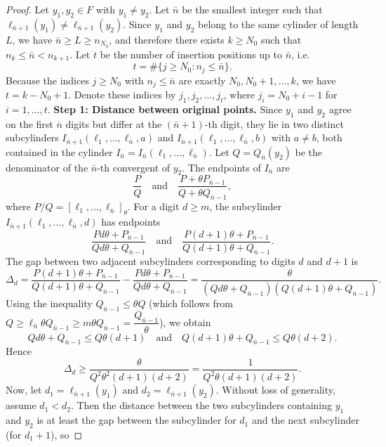 \documentclass{article}
\numberwithin{equation}{section}
\begin{document}
{
\begin{proof}
Let $y_1, y_2 \in F$ with $y_1 \neq y_2$. Let $\bar{n}$ be the smallest integer such that $\ell_{\bar{n}+1}(y_1) \neq \ell_{\bar{n}+1}(y_2)$. Since $y_1$ and $y_2$ belong to the same cylinder of length $L$, we have $\bar{n} \geq L \geq n_{N_0}$, and therefore there exists $k \geq N_0$ such that $n_k \leq \bar{n} < n_{k+1}$.
%
Let $t$ be the number of insertion positions up to $\bar{n}$, i.e.
\[
t = \#\{j \geq N_0 : n_j \leq \bar{n}\}.
\]
Because the indices $j \geq N_0$ with $n_j \leq \bar{n}$ are exactly $N_0, N_0+1, \dots, k$, we have $t = k - N_0 + 1$. Denote these indices by $j_1, j_2, \dots, j_t$, where $j_i = N_0 + i - 1$ for $i = 1, \dots, t$.
%
\newline
\noindent\textbf{Step 1: Distance between original points.}
Since $y_1$ and $y_2$ agree on the first $\bar{n}$ digits but differ at the $(\bar{n}+1)$-th digit, they lie in two distinct subcylinders $I_{\bar{n}+1}(\ell_1, \ldots, \ell_{\bar{n}}, a)$ and $I_{\bar{n}+1}(\ell_1, \ldots, \ell_{\bar{n}}, b)$ with $a \neq b$, both contained in the cylinder $I_{\bar{n}} = I_{\bar{n}}(\ell_1, \ldots, \ell_{\bar{n}})$.
% 
Let $Q = Q_{\bar{n}}(y_2)$ be the denominator of the $\bar{n}$-th convergent of $y_2$. The endpoints of $I_{\bar{n}}$ are 
\[
\frac{P}{Q} \quad \text{and} \quad \frac{P + \theta P_{\bar{n}-1}}{Q + \theta Q_{\bar{n}-1}},
\]
where $P/Q = [\ell_1, \ldots, \ell_{\bar{n}}]_\theta$. For a digit $d \geq m$, the subcylinder $I_{\bar{n}+1}(\ell_1, \ldots, \ell_{\bar{n}}, d)$ has endpoints
\[
\frac{P d\theta + P_{\bar{n}-1}}{Q d\theta + Q_{\bar{n}-1}} \quad \text{and} \quad \frac{P (d+1)\theta + P_{\bar{n}-1}}{Q (d+1)\theta + Q_{\bar{n}-1}}.
\]
The gap between two adjacent subcylinders corresponding to digits $d$ and $d+1$ is
\[
\Delta_d = \frac{P (d+1)\theta + P_{\bar{n}-1}}{Q (d+1)\theta + Q_{\bar{n}-1}} - \frac{P d\theta + P_{\bar{n}-1}}{Q d\theta + Q_{\bar{n}-1}}
= \frac{\theta}{(Q d\theta + Q_{\bar{n}-1})(Q (d+1)\theta + Q_{\bar{n}-1})}.
\]
Using the inequality $Q_{\bar{n}-1} \leq \theta Q$ (which follows from $Q \geq \ell_{\bar{n}} \theta Q_{\bar{n}-1} \geq  m\theta Q_{\bar{n}-1} = \dfrac{Q_{\bar{n}-1}}{\theta}$), we obtain
\[
Q d\theta + Q_{\bar{n}-1} \leq  Q\theta\left(d + 1 \right) 
\quad
\text{and} \quad 
Q (d+1)\theta + Q_{\bar{n}-1} \leq Q \theta (d+2). 
\]
Hence
\[
\Delta_d \geq \frac{\theta}{Q^2 \theta^2 (d+1)(d+2)}=\frac{1}{Q^2 \theta (d+1)(d+2)}.
\]
Now, let $d_1 = \ell_{\bar{n}+1}(y_1)$ and $d_2 = \ell_{\bar{n}+1}(y_2)$. Without loss of generality, assume $d_1 < d_2$. Then the distance between the two subcylinders containing $y_1$ and $y_2$ is at least the gap between the subcylinder for $d_1$ and the next subcylinder (for $d_1+1$), so

\end{proof}}
\end{document}
